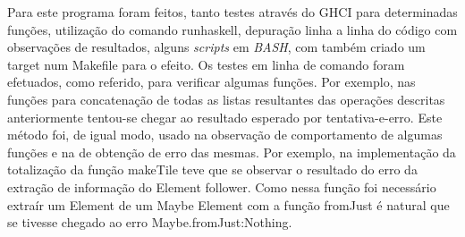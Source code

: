 Para este  programa foram  feitos, tanto  testes através  do GHCI  para determinadas  funções, utilização
do  comando  runhaskell,  depuração linha  a  linha  do  código  com observações  de  resultados,  alguns
\emph{scripts} em \emph{BASH}, com também criado um target num  Makefile para o efeito. Os testes em linha de
comando foram  efetuados, como  referido, para verificar  algumas funções. Por  exemplo, nas  funções para
concatenação de  todas as  listas resultantes  das operações descritas  anteriormente tentou-se  chegar ao
resultado  esperado  por  tentativa-e-erro.  Este  método  foi, de  igual  modo,  usado  na  observação  de
comportamento de algumas funções  e na de obtenção de erro das mesmas.  Por exemplo, na implementação da
totalização da função makeTile  teve que se observar o resultado do erro  da extração de informação do
Element follower. Como nessa  função foi necessário extraír um Element de um  Maybe Element com a função
fromJust é natural que se tivesse chegado ao erro Maybe.fromJust:Nothing.

